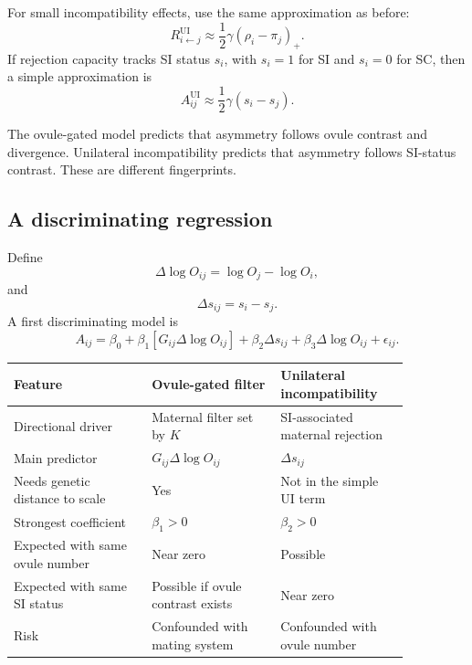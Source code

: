 \documentclass[12pt]{article}
\begin{document}
For small incompatibility effects, use the same approximation as before:
\begin{equation}
R^{\mathrm{UI}}_{i\leftarrow j}\approx \frac{1}{2}\gamma(\rho_i-\pi_j)_+.
\end{equation}
If rejection capacity tracks SI status $s_i$, with $s_i=1$ for SI and $s_i=0$ for SC, then a simple approximation is
\begin{equation}
A^{\mathrm{UI}}_{ij}\approx \frac{1}{2}\gamma(s_i-s_j).
\label{eq:Aui}
\end{equation}

\begin{conclusionbox}
The ovule-gated model predicts that asymmetry follows ovule contrast and divergence. Unilateral incompatibility predicts that asymmetry follows SI-status contrast. These are different fingerprints.
\end{conclusionbox}

\subsection{A discriminating regression}

Define
\begin{equation}
\Delta\log O_{ij}=\log O_j-\log O_i,
\end{equation}
and
\begin{equation}
\Delta s_{ij}=s_i-s_j.
\end{equation}
A first discriminating model is
\begin{equation}
A_{ij}=\beta_0+\beta_1\left[G_{ij}\Delta\log O_{ij}\right]
+\beta_2\Delta s_{ij}+\beta_3\Delta\log O_{ij}+\epsilon_{ij}.
\label{eq:discrim}
\end{equation}

\begin{center}
\begin{tabular}{>{\raggedright\arraybackslash}p{0.30\linewidth} >{\raggedright\arraybackslash}p{0.28\linewidth} >{\raggedright\arraybackslash}p{0.28\linewidth}}
\toprule
Feature & Ovule-gated filter & Unilateral incompatibility \\
\midrule
Directional driver & Maternal filter set by $K$ & SI-associated maternal rejection \\
Main predictor & $G_{ij}\Delta\log O_{ij}$ & $\Delta s_{ij}$ \\
Needs genetic distance to scale & Yes & Not in the simple UI term \\
Strongest coefficient & $\beta_1>0$ & $\beta_2>0$ \\
Expected with same ovule number & Near zero & Possible \\
Expected with same SI status & Possible if ovule contrast exists & Near zero \\
Risk & Confounded with mating system & Confounded with ovule number \\
\bottomrule
\end{tabular}
\end{center}
\end{document}
